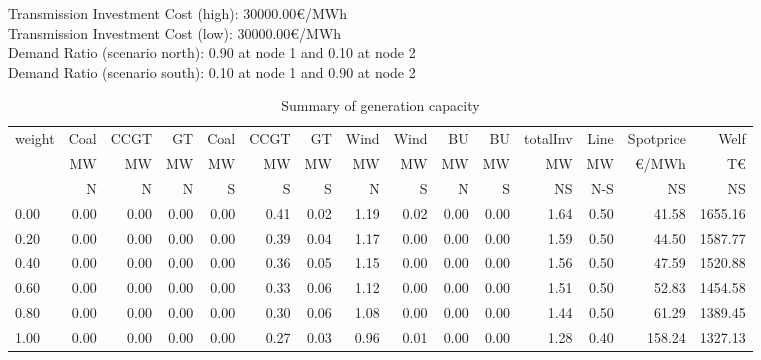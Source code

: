 \documentclass[landscape]{article}
\begin{document}
\clearpage
Transmission Investment Cost (high):    30000.00\euro/MWh\\
Transmission Investment Cost (low):    30000.00\euro/MWh\\
Demand Ratio (scenario north):        0.90 at node 1 and         0.10 at node 2\\
Demand Ratio (scenario south):        0.10 at node 1 and         0.90 at node 2\\
\begin{table}[htb]\caption{Summary of generation capacity}
\begin{tabular}{l|rrrrrr|rr|rr|rr|rr}
\toprule
 weight &    Coal &     CCGT &      GT &   Coal  &   CCGT &      GT &    Wind &    Wind  &  BU  &  BU  & totalInv  &    Line   &  Spotprice   &  Welf   \\
        &      MW &       MW &      MW &      MW &     MW &      MW &      MW &      MW  &  MW  &  MW  &    MW     &    MW     &  \euro/MWh &  T\euro   \\
        &       N &       N  &      N  &      S  &      S &       S &       N &       S  &  N   &  S   &    NS     &    N-S    &  NS      &   NS    \\
\midrule
        0.00&        0.00&        0.00&        0.00&        0.00&        0.41&        0.02&        1.19&        0.02&        0.00&        0.00&        1.64&        0.50&       41.58&     1655.16\\
        0.20&        0.00&        0.00&        0.00&        0.00&        0.39&        0.04&        1.17&        0.00&        0.00&        0.00&        1.59&        0.50&       44.50&     1587.77\\
        0.40&        0.00&        0.00&        0.00&        0.00&        0.36&        0.05&        1.15&        0.00&        0.00&        0.00&        1.56&        0.50&       47.59&     1520.88\\
        0.60&        0.00&        0.00&        0.00&        0.00&        0.33&        0.06&        1.12&        0.00&        0.00&        0.00&        1.51&        0.50&       52.83&     1454.58\\
        0.80&        0.00&        0.00&        0.00&        0.00&        0.30&        0.06&        1.08&        0.00&        0.00&        0.00&        1.44&        0.50&       61.29&     1389.45\\
        1.00&        0.00&        0.00&        0.00&        0.00&        0.27&        0.03&        0.96&        0.01&        0.00&        0.00&        1.28&        0.40&      158.24&     1327.13\\
\bottomrule
\end{tabular}
\end{table}
\clearpage
\end{document}
